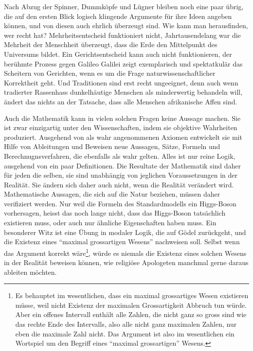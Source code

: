 Nach Abzug der Spinner, Dummköpfe und Lügner bleiben noch eine
paar übrig, die auf den ersten Blick logisch klingende Argumente
für ihre Ideen angeben können, und von diesen auch ehrlich 
überzeugt sind.
Wie kann man herausfinden, wer recht hat?
Mehrheitsentscheid funktioniert nicht, Jahrtausendelang war
die Mehrheit der Menschheit überzeugt, dass die Erde den Mittelpunkt
des Universums bildet.
Ein Gerichtsentscheid kann auch nicht funktionieren, der berühmte
Prozess gegen Galileo Galilei zeigt exemplarisch und spektatkulär
das Scheitern von Gerichten, wenn es um die Frage naturwissenschaftlicher
Korrektheit geht.
Und Traditionen sind erst recht ungeeignet, denn auch wenn tradierter Rassenhass
dunkelhäutige Menschen als minderwertig behandeln will, ändert das
nichts an der Tatsache, dass alle Menschen afrikanische Affen sind.

Auch die Mathematik kann in vielen solchen Fragen keine Aussage machen.
Sie ist zwar einzigartig unter den Wissenschaften, indem
sie objektive Wahrheiten produziert.
Ausgehend von als wahr angenommenen Axiomen entwickelt sie mit 
Hilfe von Ableitungen und Beweisen neue Aussagen, Sätze, Formeln
und Berechnugnsverfahren, die ebenfalls als wahr gelten.
Alles ist nur reine Logik, ausgehend von ein paar Definitionen.
Die Resultate der Mathematik sind daher für jeden die selben, 
sie sind unabhängig von jeglichen Voraussetzungen in der Realität.
Sie ändern sich daher auch nicht, wenn die Realität verändert wird.
Mathematische Aussagen, die sich auf die Natur beziehen, müssen daher
verifiziert werden.
Nur weil die Formeln des Standardmodells ein Higgs-Boson vorhersagen,
heisst das noch lange nicht, dass das Higgs-Boson tatsächlich existieren
muss, oder auch nur ähnliche Eigenschaften haben muss.
Ein besonderer Witz ist eine Übung in modaler Logik, die auf Gödel
zurückgeht, und die Existenz eines ``maximal grossartigen Wesens'' 
nachweisen soll. 
Selbst wenn das Argument korrekt wäre\footnote{Es behauptet im wesentlichen,
dass ein maximal grossartiges Wesen existieren müsse, weil nicht Existenz
der maximalen Grossartigkeit Abbruch tun würde.
Aber ein offenes Intervall enthält alle Zahlen, die nicht ganz so gross
sind wie das rechte Ende des Intervalls, also alle nicht ganz maximalen
Zahlen, nur eben die maximale Zahl nicht.
Das Argument ist also im wesentlichen ein Wortspiel um den Begriff eines
``maximal grossartigen'' Wesens.}, würde es niemals die Existenz eines
solchen Wesens in der Realität beweisen können, wie religiöse
Apologeten manchmal gerne daraus ableiten möchten.

